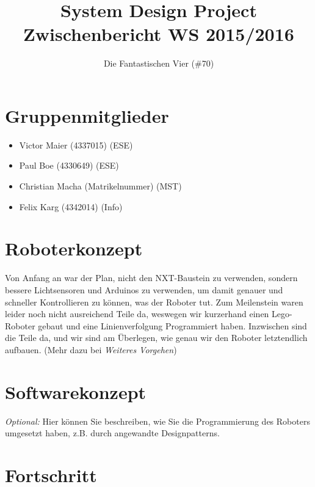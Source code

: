 \documentclass[11pt,a4paper]{article}
\title{
  \Huge System Design Project \\
  \LARGE Zwischenbericht WS 2015/2016
}
\author{
  \Large Die Fantastischen Vier (\#70) \\
}
\begin{document}
\maketitle

\section{Gruppenmitglieder}
\begin{itemize}
  \item Victor Maier (4337015) (ESE)
  \item Paul Boe (4330649) (ESE)
  \item Christian Macha (Matrikelnummer) (MST)
  \item Felix Karg (4342014) (Info)
\end{itemize}

\section{Roboterkonzept}

Von Anfang an war der Plan, nicht den NXT-Baustein zu verwenden, sondern bessere Lichtsensoren
und Arduinos zu verwenden, um damit genauer und schneller Kontrollieren zu können, was der 
Roboter tut. Zum Meilenstein waren leider noch nicht ausreichend Teile da, weswegen wir kurzerhand
einen Lego-Roboter gebaut und eine Linienverfolgung Programmiert haben. Inzwischen sind die Teile
da, und wir sind am Überlegen, wie genau wir den Roboter letztendlich aufbauen. 
(Mehr dazu bei \emph{Weiteres Vorgehen})

\section{Softwarekonzept}

\emph{Optional:} Hier können Sie beschreiben, wie Sie die Programmierung des Roboters umgesetzt haben, z.B. durch angewandte Designpatterns.

\section{Fortschritt}
\end{document}
